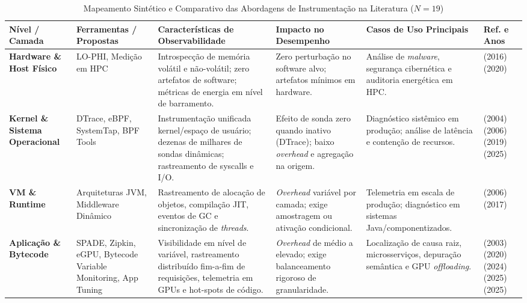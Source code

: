\documentclass[sigconf, anonymous]{acmart}
\begin{document}
\begin{table}[htbp]
\centering
\small
\setlength{\tabcolsep}{3pt}
\caption{Mapeamento Sintético e Comparativo das Abordagens de Instrumentação na Literatura ($N=19$)}
\label{tab:analise_comparativa}
\begin{tabular}{|p{}|p{}|p{}|p{}|p{}|p{}|}
\hline
\textbf{Nível / Camada} & \textbf{Ferramentas / Propostas} & \textbf{Características de Observabilidade} & \textbf{Impacto no Desempenho} & \textbf{Casos de Uso Principais} & \textbf{Ref. e Anos} \\ \hline

\textbf{Hardware \& Host Físico} & LO-PHI, Medição em HPC & Introspecção de memória volátil e não-volátil; zero artefatos de software; métricas de energia em nível de barramento. & Zero perturbação no software alvo; artefatos mínimos em hardware. & Análise de \textit{malware}, segurança cibernética e auditoria energética em HPC. & \cite{spensky_2016} (2016)\newline \cite{ilsche_2020} (2020) \\ \hline

\textbf{Kernel \& Sistema Operacional} & DTrace, eBPF, SystemTap, BPF Tools & Instrumentação unificada kernel/espaço de usuário; dezenas de milhares de sondas dinâmicas; rastreamento de syscalls e I/O. & Efeito de sonda zero quando inativo (DTrace); baixo \textit{overhead} e agregação na origem. & Diagnóstico sistêmico em produção; análise de latência e contenção de recursos. & \cite{cantrill_2004} (2004)\newline \cite{cantrill_2006} (2006)\newline \cite{gregg_2019} (2019)\newline \cite{volpert_2025} (2025) \\ \hline

\textbf{VM \& Runtime} & Arquiteturas JVM, Middleware Dinâmico & Rastreamento de alocação de objetos, compilação JIT, eventos de GC e sincronização de \textit{threads}. & \textit{Overhead} variável por camada; exige amostragem ou ativação condicional. & Telemetria em escala de produção; diagnóstico em sistemas Java/componentizados. & \cite{reilly_2006} (2006)\newline \cite{ghanta_2017} (2017) \\ \hline

\textbf{Aplicação \& Bytecode} & SPADE, Zipkin, eGPU, Bytecode Variable Monitoring, App Tuning & Visibilidade em nível de variável, rastreamento distribuído fim-a-fim de requisições, telemetria em GPUs e hot-spots de código. & \textit{Overhead} de médio a elevado; exige balanceamento rigoroso de granularidade. & Localização de causa raiz, microsserviços, depuração semântica e GPU \textit{offloading}. & \cite{brown_2003} (2003)\newline \cite{vysocky_2019} (2020)\newline \cite{marvis_2024} (2024)\newline \cite{wang_2025} (2025)\newline \cite{yang_2025} (2025) \\ \hline


\end{tabular}
\end{table}
\end{document}

